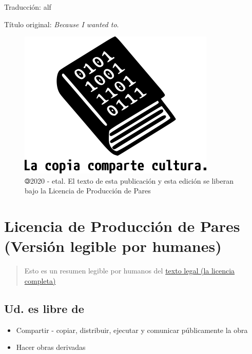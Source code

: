 \documentclass[
]{book}
\providecommand{\tightlist}{%
  \setlength{\itemsep}{0pt}\setlength{\parskip}{0pt}}
\begin{document}
Traducción: alf

Título original: \emph{Because I wanted to}.

\begin{figure}
\centering
\includegraphics{images/lccc.png}
\caption{🄯2020 - etal. El texto de esta publicación y esta edición se liberan bajo la Licencia de
Producción de Pares}
\end{figure}

\hypertarget{licencia-de-producciuxf3n-de-pares-versiuxf3n-legible-por-humanes}{%
\chapter*{Licencia de Producción de Pares (Versión legible por humanes)}\label{licencia-de-producciuxf3n-de-pares-versiuxf3n-legible-por-humanes}}

\begin{quote}
Esto es un resumen legible por humanos del \href{http://endefensadelsl.org/ppl_es.html}{texto legal (la licencia
completa)}
\end{quote}

\hypertarget{ud.-es-libre-de}{%
\section*{Ud. es libre de}\label{ud.-es-libre-de}}

\begin{itemize}
\tightlist
\item
  Compartir - copiar, distribuir, ejecutar y comunicar públicamente la obra
\item
  Hacer obras derivadas
\end{itemize}
\end{document}
